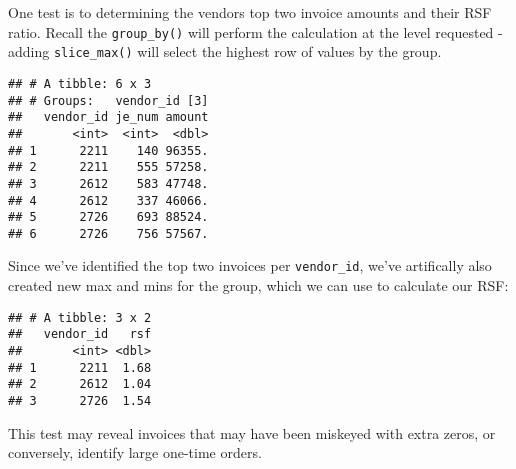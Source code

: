 \documentclass[
]{book}
\newenvironment{Shaded}{\begin{snugshade}}{\end{snugshade}}
\newcommand{\DataTypeTok}[1]{\textcolor[rgb]{0.13,0.29,0.53}{#1}}
\newcommand{\DecValTok}[1]{\textcolor[rgb]{0.00,0.00,0.81}{#1}}
\newcommand{\KeywordTok}[1]{\textcolor[rgb]{0.13,0.29,0.53}{\textbf{#1}}}
\newcommand{\NormalTok}[1]{#1}
\newcommand{\OperatorTok}[1]{\textcolor[rgb]{0.81,0.36,0.00}{\textbf{#1}}}
\newcommand{\StringTok}[1]{\textcolor[rgb]{0.31,0.60,0.02}{#1}}
\begin{document}
One test is to determining the vendors top two invoice amounts and their RSF ratio. Recall the \texttt{group\_by()} will perform the calculation at the level requested - adding \texttt{slice\_max()} will select the highest row of values by the group.

\begin{Shaded}
\end{Shaded}

\begin{verbatim}
## # A tibble: 6 x 3
## # Groups:   vendor_id [3]
##   vendor_id je_num amount
##       <int>  <int>  <dbl>
## 1      2211    140 96355.
## 2      2211    555 57258.
## 3      2612    583 47748.
## 4      2612    337 46066.
## 5      2726    693 88524.
## 6      2726    756 57567.
\end{verbatim}

Since we've identified the top two invoices per \texttt{vendor\_id}, we've artifically also created new max and mins for the group, which we can use to calculate our RSF:

\begin{Shaded}
\end{Shaded}

\begin{verbatim}
## # A tibble: 3 x 2
##   vendor_id   rsf
##       <int> <dbl>
## 1      2211  1.68
## 2      2612  1.04
## 3      2726  1.54
\end{verbatim}

This test may reveal invoices that may have been miskeyed with extra zeros, or conversely, identify large one-time orders.
\end{document}

